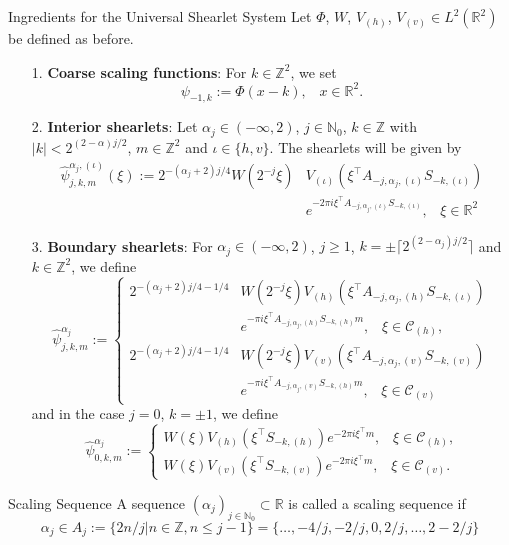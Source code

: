 \begin{frame}
\begin{block}{Ingredients for the Universal Shearlet System}
Let $\Phi$, $W$, $V_{(h)}$, $V_{(v)}\in L^2(\mathbb{R}^2)$ be defined as before.
\begin{enumerate}
\item[1.] \textbf{Coarse scaling functions}: For $k\in\mathbb{Z}^2$, we set 
$$
\psi_{-1,k}:=\Phi(x-k)\textrm{,}\quad x\in\mathbb{R}^2.
$$
\item[2.] \textbf{Interior shearlets}: Let $\alpha_j\in (-\infty,2)$, $j\in\mathbb{N}_0$, $k\in\mathbb{Z}$ with $|k|< 2^{(2-\alpha)j/2}$, $m\in\mathbb{Z}^2$ and $\iota\in\{h,v\}$. The shearlets will be given by 
\small
$$
\begin{aligned}
\hat{\psi}^{\alpha_j,(\iota)}_{j,k,m}(\xi):=2^{-(\alpha_j+2)j/4}W(2^{-j}\xi)&V_{(\iota)}(\xi^{\top} A_{-j,\alpha_j,(\iota)}S_{-k,(\iota)})\\
&e^{-2\pi i\xi^{\top}A_{-j,\alpha_j,(\iota)}S_{-k,(\iota)}}\textrm{,}\quad \xi\in\mathbb{R}^2
\end{aligned}
$$
\end{enumerate}
\end{block}
\end{frame}

\begin{frame}
\begin{block}{}
\begin{enumerate}
\item[3.] \textbf{Boundary shearlets}: For $\alpha_j \in(-\infty,2)$, $j\geq 1$, $k=\pm\lceil 2^{(2-\alpha_j)j/2}\rceil$ and $k\in\mathbb{Z}^2$, we define
$$
\hat{\psi}_{j,k,m}^{\alpha_j}:=
\begin{cases}
2^{-(\alpha_j+2)j/4-1/4}&W(2^{-j}\xi)V_{(h)}(\xi^{\top} A_{-j,\alpha_j,(h)}S_{-k,(\iota)})\\
&e^{-\pi i\xi^{\top}A_{-j,\alpha_j,(h)}S_{-k,(h)}m}\textrm{,}\quad \xi\in\mathcal{C}_{(h)},\\
2^{-(\alpha_j+2)j/4-1/4}&W(2^{-j}\xi)V_{(v)}(\xi^{\top}A_{-j,\alpha_j,(v)}S_{-k,(v)})\\
&e^{-\pi i\xi^{\top}A_{-j,\alpha_j,(v)}S_{-k,(h)}m}\textrm{,}\quad \xi\in\mathcal{C}_{(v)}
\end{cases}
$$
and in the case $j=0$, $k=\pm 1$, we define
$$
\hat{\psi}^{\alpha_j}_{0,k,m}:=
\begin{cases}
W(\xi) V_{(h)}(\xi^{\top}S_{-k,(h)})e^{-2\pi i\xi^{\top}m}\textrm{,}\quad \xi\in\mathcal{C}_{(h)}\textrm{,}\\
W(\xi)V_{(v)}(\xi^{\top}S_{-k,(v)})e^{-2\pi i\xi^{\top}m}\textrm{,}\quad \xi\in\mathcal{C}_{(v)}.
\end{cases}
$$
\end{enumerate}
\end{block}

\pause
\begin{block}{Scaling Sequence}
A sequence $(\alpha_j)_{j\in\mathbb{N}_0}\subset \mathbb{R}$ is called a scaling sequence if
$$
\alpha_j\in A_j:=\{2n/j| n\in\mathbb{Z},n\leq j-1\}=\{\ldots,-4/j,-2/j,0,2/j,\ldots,2-2/j\}
$$
\end{block}
\end{frame}


